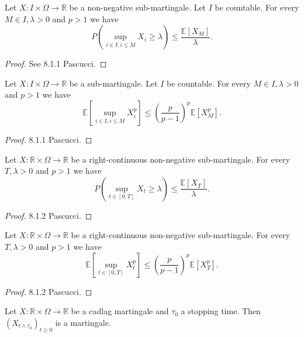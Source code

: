 \begin{lemma}\label{lem:doob_countable}
  Let $X:I\times\Omega\rightarrow \mathbb{R}$ be a non-negative sub-martingale.  Let $I$ be countable.
  For every $M\in I,\lambda > 0$ and $p>1$ we have
  $$
  P\left( \sup_{i\in I, i\leq M}X_i\geq\lambda \right)\leq \frac{\mathbb{E}[X_M]}{\lambda}.
  $$
\end{lemma}
\begin{proof}
  See 8.1.1 Pascucci.
\end{proof}

\begin{lemma}\label{lem:doob_countable_cor}
  Let $X:I\times\Omega\rightarrow \mathbb{R}$ be a sub-martingale. Let $I$ be countable.
  For every $M\in I,\lambda > 0$ and $p>1$ we have
  $$
  \mathbb{E}\left[ \sup_{i\in I, i\leq M}X_i^p \right]\leq \left(\frac{p}{p-1}\right)^p\mathbb{E}[X_M^p].
  $$
\end{lemma}
\begin{proof}
  8.1.1 Pascucci.
\end{proof}

\begin{theorem}\label{thm:doob_ineq}
  Let $X:\mathbb{R}\times\Omega\rightarrow \mathbb{R}$ be a right-continuous non-negative sub-martingale.
  For every $T, \lambda>0$ and $p>1$ we have
  $$
  P\left( \sup_{t\in[0,T]}X_t\geq\lambda \right)\leq \frac{\mathbb{E}[X_T]}{\lambda}.
  $$
\end{theorem}
\begin{proof}
  8.1.2 Pascucci.
\end{proof}

\begin{theorem}\label{thm:doob_lp}
  Let $X:\mathbb{R}\times\Omega\rightarrow \mathbb{R}$ be a right-continuous non-negative sub-martingale.
  For every $T, \lambda>0$ and $p>1$ we have
  $$
  \mathbb{E}\left[ \sup_{t\in[0,T]}X_t^p \right]\leq \left(\frac{p}{p-1}\right)^p\mathbb{E}[X_T^p].
  $$
\end{theorem}
\begin{proof}
  8.1.2 Pascucci.
\end{proof}

\begin{lemma}\label{lem:stop_of_mg_is_mg}
  Let $X:\mathbb{R}\times\Omega\rightarrow \mathbb{R}$ be a cadlag martingale and $\tau_0$ a stopping time. Then $(X_{t\wedge\tau_0})_{t\geq 0}$ is a martingale.
\end{lemma}

